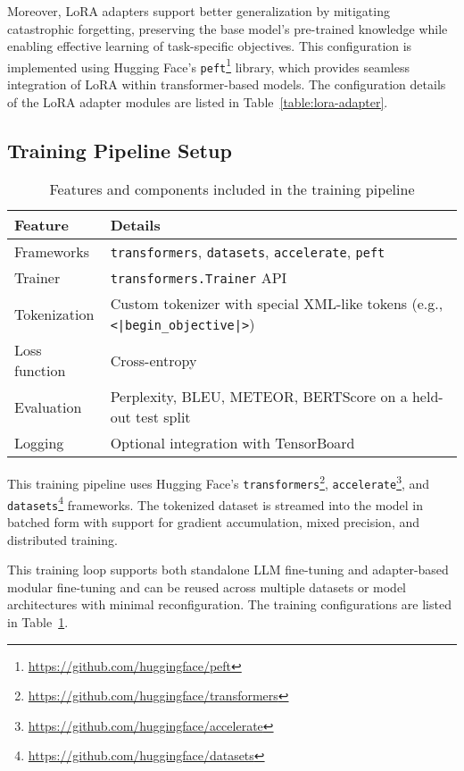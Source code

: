 Moreover, LoRA adapters support better generalization by mitigating catastrophic forgetting,
preserving the base model's pre-trained knowledge while enabling effective learning
of task-specific objectives. This configuration is implemented using Hugging Face's
\texttt{peft}\footnote{\url{https://github.com/huggingface/peft}} library, which provides seamless integration of LoRA within transformer-based
models. The configuration details of the LoRA adapter modules are listed in Table~\ref{table:lora-adapter}.

\subsection{Training Pipeline Setup}

\begin{table}[t]
  \centering
  \scriptsize
  \renewcommand{\arraystretch}{1.3}
  \begin{tabularx}{0.95\textwidth}{
    >{\raggedright\arraybackslash}p{5cm}
    >{\centering\arraybackslash}X
  }
    \toprule
    \textbf{Feature} & \textbf{Details} \\
    \midrule
    Frameworks & \texttt{transformers}, \texttt{datasets}, \texttt{accelerate}, \texttt{peft} \\
    Trainer & \texttt{transformers.Trainer} API \\
    Tokenization & Custom tokenizer with special XML-like tokens (e.g., \texttt{<|begin\_objective|>}) \\
    Loss function & Cross-entropy \\
    Evaluation & Perplexity, BLEU, METEOR, BERTScore on a held-out test split \\
    Logging & Optional integration with TensorBoard \\
    \bottomrule
  \end{tabularx}
  \caption{Features and components included in the training pipeline}
  \label{table:train-pipeline}
\end{table}

This training pipeline uses Hugging Face's \texttt{transformers}\footnote{\url{https://github.com/huggingface/transformers}}, \texttt{accelerate}\footnote{\url{https://github.com/huggingface/accelerate}}, and \texttt{datasets}\footnote{\url{https://github.com/huggingface/datasets}} frameworks.
The tokenized dataset is streamed into the model in batched form with support for gradient
accumulation, mixed precision, and distributed training.

This training loop supports both standalone LLM fine-tuning and adapter-based modular
fine-tuning and can be reused across multiple datasets or model architectures with
minimal reconfiguration. The training configurations are listed in Table~\ref{table:train-pipeline}.


